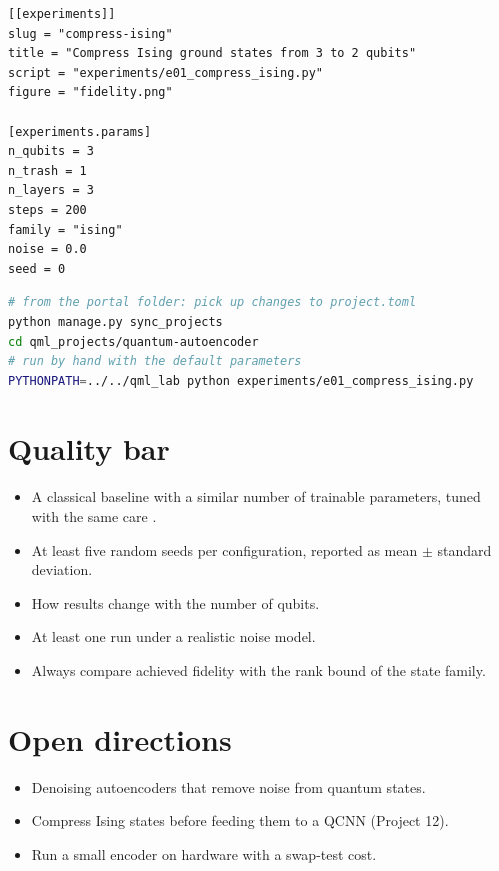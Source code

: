 \documentclass[11pt,a4paper]{article}
\begin{document}
\begin{lstlisting}[language={}]
[[experiments]]
slug = "compress-ising"
title = "Compress Ising ground states from 3 to 2 qubits"
script = "experiments/e01_compress_ising.py"
figure = "fidelity.png"

[experiments.params]
n_qubits = 3
n_trash = 1
n_layers = 3
steps = 200
family = "ising"
noise = 0.0
seed = 0
\end{lstlisting}

\begin{lstlisting}[language=bash]
# from the portal folder: pick up changes to project.toml
python manage.py sync_projects
cd qml_projects/quantum-autoencoder
# run by hand with the default parameters
PYTHONPATH=../../qml_lab python experiments/e01_compress_ising.py
\end{lstlisting}

\section{Quality bar}
\begin{itemize}
  \item A classical baseline with a similar number of trainable parameters, tuned with the same care \citep{bowles2024}.
  \item At least five random seeds per configuration, reported as mean $\pm$ standard deviation.
  \item How results change with the number of qubits.
  \item At least one run under a realistic noise model.
  \item Always compare achieved fidelity with the rank bound of the state family.
\end{itemize}

\section{Open directions}
\begin{itemize}
  \item Denoising autoencoders that remove noise from quantum states.
  \item Compress Ising states before feeding them to a QCNN (Project 12).
  \item Run a small encoder on hardware with a swap-test cost.
\end{itemize}
\end{document}
